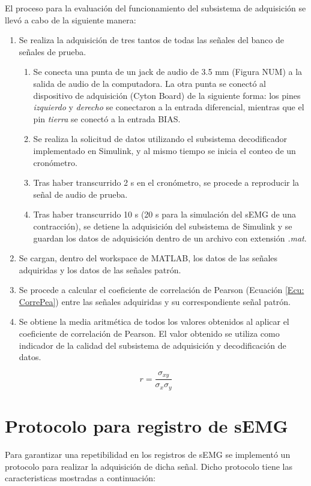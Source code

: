 \newpage
El proceso para la evaluación del funcionamiento del subsistema de adquisición se llevó a cabo de la siguiente manera:
\begin{enumerate}
	\item Se realiza la adquisición de tres tantos de todas las señales del banco de señales de prueba.
	\begin{enumerate}
		\item Se conecta una punta de un jack de audio de 3.5 mm (Figura NUM) a la salida de audio de la computadora. La otra punta se conectó al dispositivo de adquisición (Cyton Board) de la siguiente forma: los pines \emph{izquierdo} y \emph{derecho} se conectaron a la entrada diferencial, mientras que el pin \emph{tierra} se conectó a la entrada BIAS.
		\item Se realiza la solicitud de datos utilizando el subsistema decodificador implementado en Simulink, y al mismo tiempo se inicia el conteo de un cronómetro.
		\item Tras haber transcurrido 2 s en el cronómetro, se procede a reproducir la señal de audio de prueba.
		\item Tras haber transcurrido 10 s (20 s para la simulación del sEMG de una contracción), se detiene la adquisición del subsistema de Simulink y se guardan los datos de adquisición dentro de un archivo con extensión \emph{.mat}.
	\end{enumerate}
	\item Se cargan, dentro del workspace de MATLAB, los datos de las señales adquiridas y los datos de las señales patrón.
	\item Se procede a calcular el coeficiente de correlación de Pearson (Ecuación \ref{Ecu: CorrePea}) entre las señales adquiridas y su correspondiente señal patrón.
	\item Se obtiene la media aritmética de todos los valores obtenidos al aplicar el coeficiente de correlación de Pearson. El valor obtenido se utiliza como indicador de la calidad del subsistema de adquisición y decodificación de datos.
\end{enumerate}

\begin{equation}
	r = \frac{\sigma_{xy}}{\sigma_{x}\sigma_{y}}
	\label{Ecu: CorrePea}
\end{equation}


\section{Protocolo para registro de sEMG}
Para garantizar una repetibilidad en los registros de sEMG se implementó un protocolo para realizar la adquisición de dicha señal. Dicho protocolo tiene las caracteristicas mostradas a continuación:

